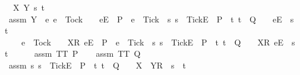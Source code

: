 \begin{isabellebody}
\ {\isasymrho}\ X\ Y\ s\ t\isanewline
\ \ \isamarkupfalse%
\ assm{}{\isacharcolon}\ {\isachardoublequoteopen}Y\ {\isasyminter}\ {\isacharbraceleft}e{\isachardot}\ e\ {\isasymnoteq}\ Tock\ {\isasymand}\ {\isacharparenleft}{\isasymrho}\ {\isacharat}\ {\isacharbrackleft}{\isacharbrackleft}e{\isacharbrackright}\isactrlsub E{\isacharbrackright}\ {\isasymin}\ P\ {\isasymand}\ e\ {\isasymnoteq}\ Tick\ {\isasymor}\ {\isacharparenleft}{\isasymexists}s{\isachardot}\ s\ {\isacharat}\ {\isacharbrackleft}{\isacharbrackleft}Tick{\isacharbrackright}\isactrlsub E{\isacharbrackright}\ {\isasymin}\ P\ {\isasymand}\ {\isacharparenleft}{\isasymexists}t{\isachardot}\ t\ {\isasymin}\ Q\ {\isasymand}\ {\isasymrho}\ {\isacharat}\ {\isacharbrackleft}{\isacharbrackleft}e{\isacharbrackright}\isactrlsub E{\isacharbrackright}\ {\isacharequal}\ s\ {\isacharat}\ t{\isacharparenright}{\isacharparenright}{\isacharparenright}\ {\isasymor}\isanewline
\ \ \ \ e\ {\isacharequal}\ Tock\ {\isasymand}\ {\isacharparenleft}{\isasymrho}\ {\isacharat}\ {\isacharbrackleft}{\isacharbrackleft}X{\isacharbrackright}\isactrlsub R{\isacharcomma}\ {\isacharbrackleft}e{\isacharbrackright}\isactrlsub E{\isacharbrackright}\ {\isasymin}\ P\ {\isasymand}\ e\ {\isasymnoteq}\ Tick\ {\isasymor}\ {\isacharparenleft}{\isasymexists}s{\isachardot}\ s\ {\isacharat}\ {\isacharbrackleft}{\isacharbrackleft}Tick{\isacharbrackright}\isactrlsub E{\isacharbrackright}\ {\isasymin}\ P\ {\isasymand}\ {\isacharparenleft}{\isasymexists}t{\isachardot}\ t\ {\isasymin}\ Q\ {\isasymand}\ {\isasymrho}\ {\isacharat}\ {\isacharbrackleft}{\isacharbrackleft}X{\isacharbrackright}\isactrlsub R{\isacharcomma}\ {\isacharbrackleft}e{\isacharbrackright}\isactrlsub E{\isacharbrackright}\ {\isacharequal}\ s\ {\isacharat}\ t{\isacharparenright}{\isacharparenright}{\isacharparenright}{\isacharbraceright}\ {\isacharequal}\ {\isacharbraceleft}{\isacharbraceright}{\isachardoublequoteclose}\isanewline
\ \ \isamarkupfalse%
\ assm{}{\isacharcolon}\ {\isachardoublequoteopen}TT\ P{\isachardoublequoteclose}\isanewline
\ \ \isamarkupfalse%
\ assm{}{\isacharcolon}\ {\isachardoublequoteopen}TT\ Q{\isachardoublequoteclose}\isanewline
\ \ \isamarkupfalse%
\ assm{}{\isacharcolon}\ {\isachardoublequoteopen}{\isasymforall}s{\isachardot}\ s\ {\isacharat}\ {\isacharbrackleft}{\isacharbrackleft}Tick{\isacharbrackright}\isactrlsub E{\isacharbrackright}\ {\isasymin}\ P\ {\isasymlongrightarrow}\ {\isacharparenleft}{\isasymforall}t{\isachardot}\ t\ {\isasymin}\ Q\ {\isasymlongrightarrow}\ {\isasymrho}\ {\isacharat}\ {\isacharbrackleft}{\isacharbrackleft}X\ {\isasymunion}\ Y{\isacharbrackright}\isactrlsub R{\isacharbrackright}\ {\isasymnoteq}\ s\ {\isacharat}\ t{\isacharparenright}{\isachardoublequoteclose}\isanewline

\end{isabellebody}
